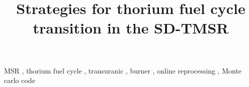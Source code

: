\documentclass[review]{elsarticle}
\begin{document}
\begin{frontmatter}
\title{Strategies for thorium fuel cycle transition in the SD-TMSR}

\date{}                     %




	
\begin{keyword}
MSR \sep
thorium fuel cycle \sep
transuranic \sep
burner \sep
online reprocessing \sep
Monte carlo code
\end{keyword}



\end{frontmatter}
\glsresetall

\linenumbers



\FloatBarrier

\FloatBarrier

\FloatBarrier
%

\FloatBarrier

\FloatBarrier


\newpage
\appendix

\end{document}
